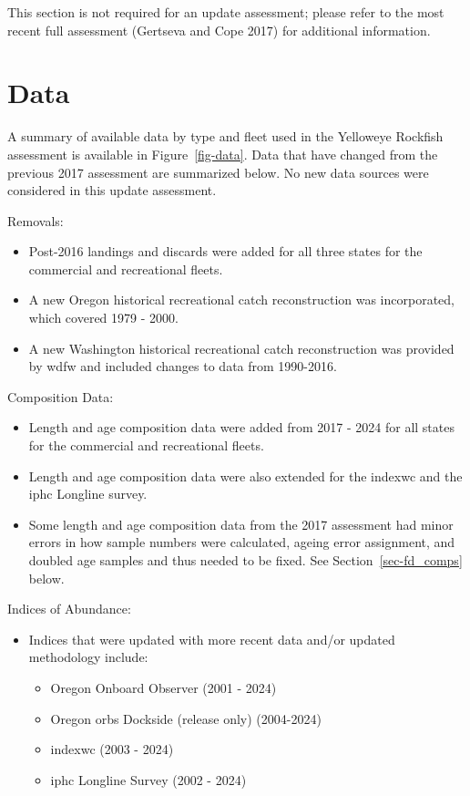 \documentclass[
]{scrartcl}
\providecommand{\tightlist}{%
  \setlength{\itemsep}{0pt}\setlength{\parskip}{0pt}}\usepackage{longtable,booktabs,array}
\begin{document}
This section is not required for an update assessment; please refer to
the most recent full assessment (Gertseva and Cope 2017) for additional
information.

\newpage{}

\section{Data}\label{sec-data}

A summary of available data by type and fleet used in the Yelloweye
Rockfish assessment is available in Figure~\ref{fig-data}. Data that
have changed from the previous 2017 assessment are summarized below. No
new data sources were considered in this update assessment.

Removals:

\begin{itemize}
\tightlist
\item
  Post-2016 landings and discards were added for all three states for
  the commercial and recreational fleets.
\item
  A new Oregon historical recreational catch reconstruction was
  incorporated, which covered 1979 - 2000.
\item
  A new Washington historical recreational catch reconstruction was
  provided by \gls{wdfw} and included changes to data from 1990-2016.
\end{itemize}

Composition Data:

\begin{itemize}
\tightlist
\item
  Length and age composition data were added from 2017 - 2024 for all
  states for the commercial and recreational fleets.
\item
  Length and age composition data were also extended for the
  \gls{indexwc} and the \gls{iphc} Longline survey.
\item
  Some length and age composition data from the 2017 assessment had
  minor errors in how sample numbers were calculated, ageing error
  assignment, and doubled age samples and thus needed to be fixed. See
  Section~\ref{sec-fd_comps} below.
\end{itemize}

Indices of Abundance:

\begin{itemize}
\tightlist
\item
  Indices that were updated with more recent data and/or updated
  methodology include:

  \begin{itemize}
  \tightlist
  \item
    Oregon Onboard Observer (2001 - 2024)
  \item
    Oregon \gls{orbs} Dockside (release only) (2004-2024)
  \item
    \gls{indexwc} (2003 - 2024)
  \item
    \gls{iphc} Longline Survey (2002 - 2024)
  \end{itemize}
\end{itemize}
\end{document}
